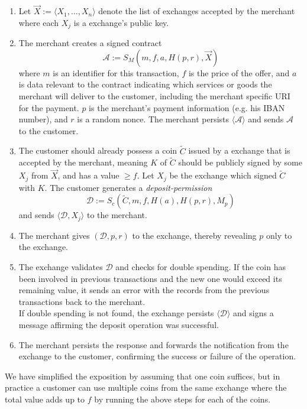 \documentclass[sigconf, authordraft]{acmart}
\begin{document}
\begin{enumerate}
\item \label{contract}
  Let $\vec{X} := \langle X_1, \ldots, X_n \rangle$ denote the list of
  exchanges accepted by the merchant where each $X_j$ is a exchange's
  public key.
\item
  The merchant creates a signed contract
  \begin{equation*}
    \mathcal{A} := S_M(m, f, a, H(p, r), \vec{X})
  \end{equation*}
  where $m$ is an identifier for this transaction, $f$ is the price of the offer,
  and $a$ is data relevant
  to the contract indicating which services or goods the merchant will
  deliver to the customer, including the merchant specific URI for the payment.
  $p$ is the merchant's payment information (e.g. his IBAN number), and
  $r$ is a random nonce.  The merchant persists $\langle \mathcal{A} \rangle$
  and sends $\mathcal{A}$ to the customer.
\item
  The customer should already possess a coin $\widetilde{C}$ issued by a exchange that is
  accepted by the merchant, meaning $K$ of $\widetilde{C}$ should be publicly signed by
  some $X_j$ from $\vec{X}$, and has a value $\geq f$.
  Let $X_j$ be the exchange which signed $\widetilde{C}$ with $K$.
  The customer generates a \emph{deposit-permission}
    $$\mathcal{D} := S_c(\widetilde{C}, m, f, H(a), H(p,r), M_p)$$
  and sends $\langle \mathcal{D}, X_j\rangle$ to the merchant. \label{step:first-post}
\item
  The merchant gives $(\mathcal{D}, p, r)$ to the exchange, thereby
  revealing $p$ only to the exchange.
\item
  The exchange validates $\mathcal{D}$ and checks for double spending.
  If the coin has been involved in previous transactions and the new
  one would exceed its remaining value, it sends an error
  with the records from the previous transactions back to the merchant. \\
  If double spending is not found, the exchange persists $\langle \mathcal{D} \rangle$
  and signs a message affirming the deposit operation was successful.
\item
  The merchant persists the response and forwards the notification from the exchange to the
  customer, confirming the success or failure
  of the operation.
\end{enumerate}

We have simplified the exposition by assuming that one coin suffices,
but in practice a customer can use multiple coins from the same
exchange where the total value adds up to $f$ by running the above
steps for each of the coins.
\end{document}
